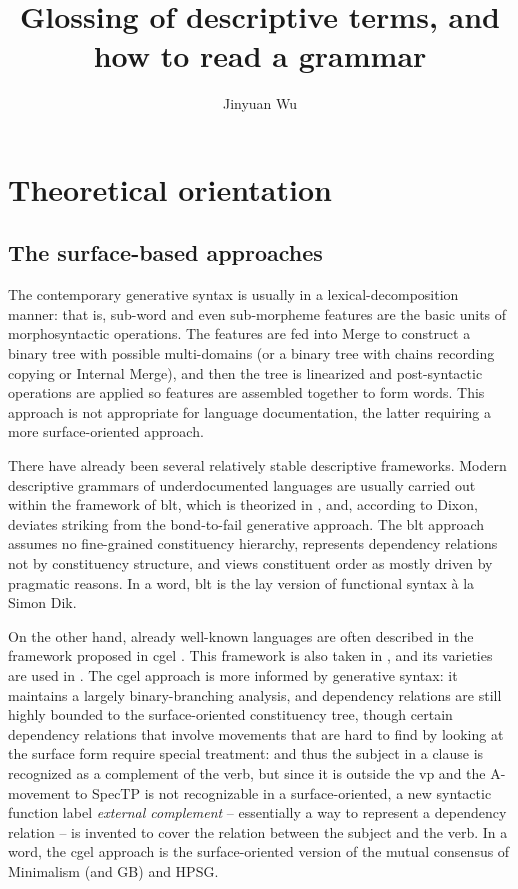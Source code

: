 \documentclass[UTF8, a4paper, oneside, scheme=plain]{ctexart}
\title{Glossing of descriptive terms, and how to read a grammar}
\author{Jinyuan Wu}
\newcommand*{\term}[1]{\emph{#1}}
\newcommand{\ala}{à la}
\begin{document}
\maketitle

\section{Theoretical orientation}\label{sec:theory}

\subsection{The surface-based approaches}

The contemporary generative syntax is usually in a lexical-decomposition manner:
that is, sub-word and even sub-morpheme features are the basic units of morphosyntactic operations.
The features are fed into Merge to construct a binary tree with possible multi-domains
(or a binary tree with chains recording copying or Internal Merge),
and then the tree is linearized and post-syntactic operations are applied 
so features are assembled together to form words.
This approach is not appropriate for language documentation,
the latter requiring a more surface-oriented approach.

There have already been several relatively stable descriptive frameworks.
Modern descriptive grammars of underdocumented languages 
are usually carried out within the framework of \ac{blt},
which is theorized in \citet{dixon2009basic1,dixon2010basic2,dixon2012basic3},
and, according to Dixon, deviates striking from the bond-to-fail generative approach.
The \ac{blt} approach assumes no fine-grained constituency hierarchy,
represents dependency relations not by constituency structure,
and views constituent order as mostly driven by pragmatic reasons.
In a word, \ac{blt} is the lay version of functional syntax \ala{} Simon Dik.

On the other hand, already well-known languages are often described in the framework proposed in 
\ac{cgel} \citep{cgel}.
This framework is also taken in \citet{abeille2021grande,huang2016reference},
and its varieties are used in \citet{demonte1999gramatica1,munoz2000gramatica2,bosque1999gramatica3}.
The \ac{cgel} approach is more informed by generative syntax:
it maintains a largely binary-branching analysis,
and dependency relations are still highly bounded to the surface-oriented constituency tree,
though certain dependency relations that involve movements that are hard to find by looking at the surface form 
require special treatment:
and thus the subject in a clause is recognized as a complement of the verb,
but since it is outside the \ac{vp} and the A-movement to SpecTP is not recognizable
in a surface-oriented,
a new syntactic function label \term{external complement} 
-- essentially a way to represent a dependency relation --
is invented to cover the relation between the subject and the verb.
In a word, the \ac{cgel} approach
is the surface-oriented version of the mutual consensus of Minimalism (and GB) and HPSG.
\end{document}

